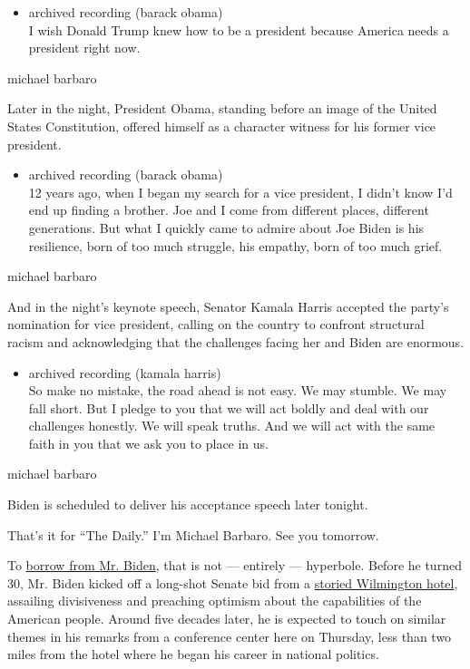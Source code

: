 \begin{itemize}
\tightlist
\item
  archived recording (barack obama)\\
  I wish Donald Trump knew how to be a president because America needs a
  president right now.
\end{itemize}

michael barbaro

Later in the night, President Obama, standing before an image of the
United States Constitution, offered himself as a character witness for
his former vice president.

\begin{itemize}
\tightlist
\item
  archived recording (barack obama)\\
  12 years ago, when I began my search for a vice president, I didn't
  know I'd end up finding a brother. Joe and I come from different
  places, different generations. But what I quickly came to admire about
  Joe Biden is his resilience, born of too much struggle, his empathy,
  born of too much grief.
\end{itemize}

michael barbaro

And in the night's keynote speech, Senator Kamala Harris accepted the
party's nomination for vice president, calling on the country to
confront structural racism and acknowledging that the challenges facing
her and Biden are enormous.

\begin{itemize}
\tightlist
\item
  archived recording (kamala harris)\\
  So make no mistake, the road ahead is not easy. We may stumble. We may
  fall short. But I pledge to you that we will act boldly and deal with
  our challenges honestly. We will speak truths. And we will act with
  the same faith in you that we ask you to place in us.
\end{itemize}

michael barbaro

Biden is scheduled to deliver his acceptance speech later tonight.

That's it for ``The Daily.'' I'm Michael Barbaro. See you tomorrow.

To
\href{https://www.nytimes3xbfgragh.onion/video/us/politics/100000006624123/biden-bidenisms-debate.html}{borrow
from Mr. Biden}, that is not --- entirely --- hyperbole. Before he
turned 30, Mr. Biden kicked off a long-shot Senate bid from a
\href{https://www.nytimes3xbfgragh.onion/2020/08/11/us/politics/hush-hush-preparations-were-underway-at-a-hotel-ballroom-in-delaware.html}{storied
Wilmington hotel}, assailing divisiveness and preaching optimism about
the capabilities of the American people. Around five decades later, he
is expected to touch on similar themes in his remarks from a conference
center here on Thursday, less than two miles from the hotel where he
began his career in national politics.

